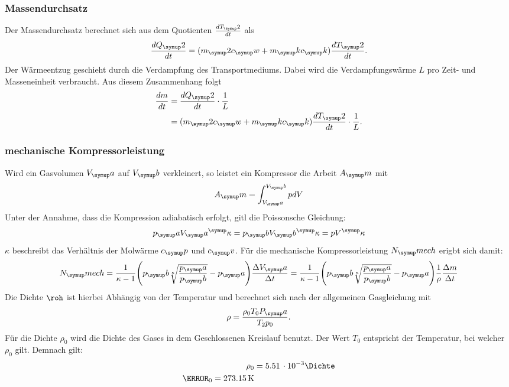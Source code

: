 \subsubsection{Massendurchsatz}
Der Massendurchsatz berechnet sich aus dem Quotienten $\frac{dT_\su{2}}{dt}$ als
\begin{equation}
  \frac{dQ_\su{2}}{dt}= (m_\su{2}c_\su{w}+m_\su{k}c_\su{k})\frac{dT_\su{2}}{dt}.
\end{equation}
Der Wärmeentzug geschieht durch die Verdampfung des Transportmediums. Dabei wird die
Verdampfungswärme $L$ pro Zeit- und Masseneinheit verbraucht. Aus diesem Zusammenhang folgt
\begin{align}
  \frac{dm}{dt} &= \frac{dQ_\su{2}}{dt} \cdot \frac{1}{L} \\
      &= (m_\su{2}c_\su{w}+m_\su{k}c_\su{k})\frac{dT_\su{2}}{dt} \cdot \frac{1}{L}.
      \label{eqn:dm/dt}
\end{align}
\subsubsection{mechanische Kompressorleistung}
Wird ein Gasvolumen $V_\su{a}$ auf $V_\su{b}$ verkleinert, so leistet ein Kompressor
die Arbeit $A_\su{m}$ mit
\begin{equation}
  A_\su{m} = \int_{V_\su{a}}^{V_\su{b}}pdV
\end{equation}
Unter der Annahme, dass die Kompression adiabatisch erfolgt, gitl die Poissonsche
Gleichung:
\begin{equation}
  p_\su{a}V_\su{a}^\su{\kappa} = p_\su{b}V_\su{b}^\su{\kappa} = pV^\su{\kappa}
\end{equation}
$\kappa$ beschreibt das Verhältnis der Molwärme $c_\su{p}$ und $c_\su{v}$.
Für die mechanische Kompressorleistung $N_\su{mech}$ erigbt sich damit:
\begin{equation}
  N_\su{mech}= \frac{1}{\kappa-1}\Biggl(p_\su{b}\sqrt[\kappa]{\frac{p_\su{a}}{p_\su{b}}}-p_\su{a}
  \Biggr)\frac{\Delta V_\su{a}}{\Delta t} = \frac{1}{\kappa-1}\Biggl(p_\su{b}\sqrt[\kappa]{\frac{p_\su{a}}{p_\su{b}}}-p_\su{a}
  \Biggr)\frac{1}{\rho}\frac{\Delta m}{\Delta t}
  \label{eqn:Nmech}
\end{equation}
Die Dichte $\roh$ ist hierbei Abhängig von der Temperatur und berechnet sich
nach der allgemeinen Gasgleichung mit
\begin{equation}
  \rho=\frac{\rho_0 T_0 P_\su{a}}{T_2 p_0}.
\end{equation}
Für die Dichte $\rho_0$ wird die Dichte des Gases in dem Geschlossenen Kreislauf
benutzt. Der Wert $T_0$ entspricht der Temperatur, bei welcher $\rho_0$ gilt.
Demnach gilt:
\begin{align*}
  \rho_0 &= 5.51\,\cdot10^{-3}\Dichte \\
  \T_0 = 273.15\Kel
  \label{eqn:rho}
\end{align*}
